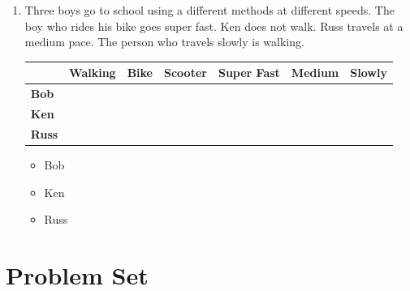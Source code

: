 \documentclass{tufte-book}
\providecommand{\tabularnewline}{\\}
\begin{document}
\begin{enumerate}
  \item Three boys go to school using a different methods at different speeds.
  The boy who rides his bike goes super fast. Ken does not walk.
  Russ travels at a medium pace. The person who travels slowly is walking.\par
  \begin{tabular}{|l|>{\centering}p{2cm}|>{\centering}p{2cm}|>{\centering}p{2cm}|>{\centering}p{2cm}|>{\centering}p{2cm}|>{\centering}p{2cm}|}
  \hline 
    & \textbf{Walking} & \textbf{Bike} & \textbf{Scooter} & \textbf{Super Fast} & \textbf{Medium} & \textbf{Slowly}\tabularnewline
  \hline 
  \textbf{Bob} &  &  &  &  &  & \tabularnewline
  \hline 
  \textbf{Ken} &  &  &  &  &  & \tabularnewline
  \hline 
  \textbf{Russ} &  &  &  &  &  & \tabularnewline
  \hline 
  \end{tabular}
  \bigskip
  \begin{itemize}
    \item Bob \dotfill\bigskip
    \item Ken \dotfill\bigskip
    \item Russ \dotfill
  \end{itemize}

\end{enumerate}

\clearpage\section{Problem Set }
\end{document}
